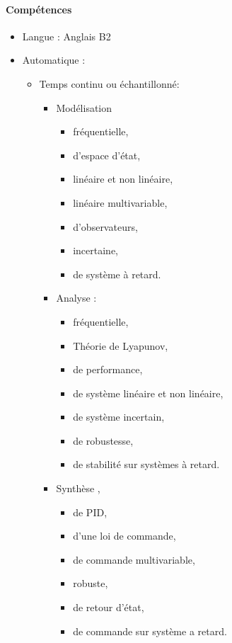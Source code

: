 \documentclass{article}
\begin{document}
\paragraph{Compétences}
\begin{itemize}

\item Langue : Anglais B2

\item Automatique :
	\begin{itemize}
	\item Temps continu ou échantillonné:
		\begin{itemize}
		\item Modélisation 
			\begin{itemize}
			\item fréquentielle,
			\item d'espace d'état, 
			\item linéaire et non linéaire, 
			\item linéaire multivariable, 
			\item d'observateurs, 
			\item incertaine,
			\item de système à retard.
			\end{itemize}		 
		\item Analyse : 
			\begin{itemize}
			\item fréquentielle,
			\item Théorie de Lyapunov,
			\item de performance,
			\item de système linéaire et non linéaire,
			\item de système incertain,
			\item de robustesse, 
			\item de stabilité sur systèmes à retard.
			\end{itemize}
		\item Synthèse , 		
			\begin{itemize}
			\item de PID,
			\item d'une loi de commande,
			\item de commande multivariable,
			\item robuste,
			\item de retour d'état, 
			\item de commande sur système a retard.
			\end{itemize}

\end{itemize}
\end{itemize}
\end{itemize}
\end{document}
